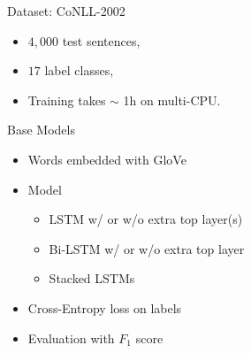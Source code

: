 \documentclass[final]{beamer}
\newlength{\sepwid}
\newlength{\onecolwid}
\newlength{\twocolwid}
\begin{document}
\begin{frame}[t]
\begin{columns}[t]
\begin{column}{\onecolwid}
\begin{block}{Dataset: CoNLL-2002}
\begin{itemize}
  \item $4,000$ test sentences,

  \item $17$ label classes,

  \item Training takes $\sim$ 1h on multi-CPU.
\end{itemize}
\end{block}

\begin{block}{Base Models}

\begin{itemize}
  \item Words embedded with GloVe

  \item Model
\begin{itemize}
\item LSTM w/ or w/o extra top layer(s)
\item Bi-LSTM w/ or w/o extra top layer
\item Stacked LSTMs
\end{itemize}

  \item Cross-Entropy loss on labels

  \item Evaluation with $F_1$ score
\end{itemize}

\end{block}

\end{column} %




\begin{column}{\sepwid}\end{column} %

\begin{column}{\twocolwid} %

\begin{columns}[t,totalwidth=\twocolwid] %

\begin{column}{\onecolwid}\vspace{-.6in} %



\end{column}
\end{columns}
\end{column}
\end{columns}
\end{frame}
\end{document}
